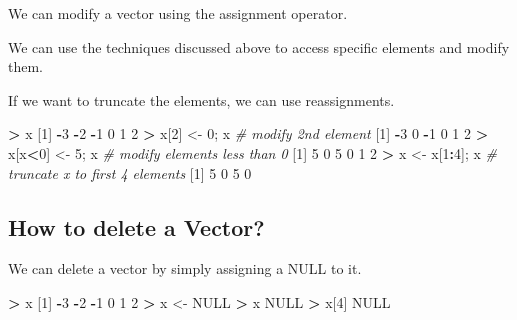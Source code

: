 \documentclass[]{book}
\newenvironment{Shaded}{\begin{snugshade}}{\end{snugshade}}
\newcommand{\DecValTok}[1]{\textcolor[rgb]{0.00,0.00,0.81}{#1}}
\newcommand{\StringTok}[1]{\textcolor[rgb]{0.31,0.60,0.02}{#1}}
\newcommand{\CommentTok}[1]{\textcolor[rgb]{0.56,0.35,0.01}{\textit{#1}}}
\newcommand{\OtherTok}[1]{\textcolor[rgb]{0.56,0.35,0.01}{#1}}
\newcommand{\OperatorTok}[1]{\textcolor[rgb]{0.81,0.36,0.00}{\textbf{#1}}}
\newcommand{\NormalTok}[1]{#1}
\theoremstyle{definition}
\theoremstyle{definition}
\theoremstyle{definition}
\theoremstyle{remark}
\begin{document}
We can modify a vector using the assignment operator.

We can use the techniques discussed above to access specific elements
and modify them.

If we want to truncate the elements, we can use reassignments.

\begin{Shaded}
\begin{Highlighting}[]
\OperatorTok{>}\StringTok{ }\NormalTok{x}
\NormalTok{[}\DecValTok{1}\NormalTok{] }\OperatorTok{-}\DecValTok{3} \OperatorTok{-}\DecValTok{2} \OperatorTok{-}\DecValTok{1}  \DecValTok{0}  \DecValTok{1}  \DecValTok{2}
\OperatorTok{>}\StringTok{ }\NormalTok{x[}\DecValTok{2}\NormalTok{] <-}\StringTok{ }\DecValTok{0}\NormalTok{; x        }\CommentTok{# modify 2nd element}
\NormalTok{[}\DecValTok{1}\NormalTok{] }\OperatorTok{-}\DecValTok{3}  \DecValTok{0} \OperatorTok{-}\DecValTok{1}  \DecValTok{0}  \DecValTok{1}  \DecValTok{2}
\OperatorTok{>}\StringTok{ }\NormalTok{x[x}\OperatorTok{<}\DecValTok{0}\NormalTok{] <-}\StringTok{ }\DecValTok{5}\NormalTok{; x   }\CommentTok{# modify elements less than 0}
\NormalTok{[}\DecValTok{1}\NormalTok{] }\DecValTok{5} \DecValTok{0} \DecValTok{5} \DecValTok{0} \DecValTok{1} \DecValTok{2}
\OperatorTok{>}\StringTok{ }\NormalTok{x <-}\StringTok{ }\NormalTok{x[}\DecValTok{1}\OperatorTok{:}\DecValTok{4}\NormalTok{]; x      }\CommentTok{# truncate x to first 4 elements}
\NormalTok{[}\DecValTok{1}\NormalTok{] }\DecValTok{5} \DecValTok{0} \DecValTok{5} \DecValTok{0}
\end{Highlighting}
\end{Shaded}

\subsection{How to delete a Vector?}\label{how-to-delete-a-vector}

We can delete a vector by simply assigning a NULL to it.

\begin{Shaded}
\begin{Highlighting}[]
\OperatorTok{>}\StringTok{ }\NormalTok{x}
\NormalTok{[}\DecValTok{1}\NormalTok{] }\OperatorTok{-}\DecValTok{3} \OperatorTok{-}\DecValTok{2} \OperatorTok{-}\DecValTok{1}  \DecValTok{0}  \DecValTok{1}  \DecValTok{2}
\OperatorTok{>}\StringTok{ }\NormalTok{x <-}\StringTok{ }\OtherTok{NULL}
\OperatorTok{>}\StringTok{ }\NormalTok{x}
\OtherTok{NULL}
\OperatorTok{>}\StringTok{ }\NormalTok{x[}\DecValTok{4}\NormalTok{]}
\OtherTok{NULL}
\end{Highlighting}
\end{Shaded}
\end{document}
